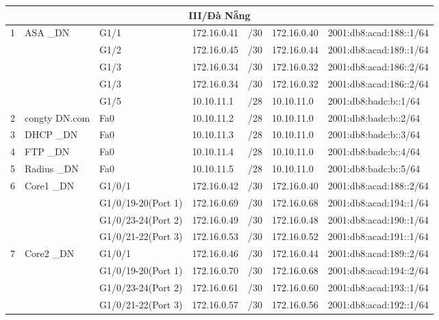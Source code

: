 \documentclass[12pt,a4paper]{report}
\begin{document}
\begin{center}
\begin{longtable}{|p{}|p{}|p{}|p{}|p{}|p{}|p{}|}
        \hline  \multicolumn{7}{|c|}{III/Đà Nẵng} \\
        \hline \multirow{5}{*}{1} &  ASA \_DN  &  G1/1  &  172.16.0.41  &  /30  &  172.16.0.40  &  2001:db8:acad:188::1/64 \\\cline{3-7}		                          &    &  G1/2  &  172.16.0.45  &  /30  &  172.16.0.44  &  2001:db8:acad:189::1/64\\\cline{3-7}	                          		                          &    &  G1/3  &  172.16.0.34  &  /30  &  172.16.0.32  &  2001:db8:acad:186::2/64\\\cline{3-7}                                             		                          &    &  G1/3  &  172.16.0.34  &  /30  &  172.16.0.32  &  2001:db8:acad:186::2/64\\\cline{3-7}                 		                          &    &  G1/5  &  10.10.11.1  &  /28  &  10.10.11.0  &  2001:db8:badc:b::1/64\\\cline{3-7}
        
        \hline  2  &  congty DN.com  &  Fa0  &  10.10.11.2  &  /28  &  10.10.11.0  &  2001:db8:badc:b::2/64 \\
\hline  3  &  DHCP \_DN  &  Fa0  &  10.10.11.3  &  /28  &  10.10.11.0  &  2001:db8:badc:b::3/64 \\
\hline  4  &  FTP \_DN  &  Fa0  &  10.10.11.4  &  /28  &  10.10.11.0  &  2001:db8:badc:b::4/64 \\
\hline  5  &  Radius \_DN  &  Fa0  &  10.10.11.5  &  /28  &  10.10.11.0  &  2001:db8:badc:b::5/64 \\

\hline  \multirow{4}{*}{6}  &  Core1 \_DN  &  G1/0/1  &  172.16.0.42  &  /30  &  172.16.0.40  &  2001:db8:acad:188::2/64 \\\cline{3-7}
&    &  G1/0/19-20(Port 1)  &  172.16.0.69  &  /30  &  172.16.0.68  &  2001:db8:acad:194::1/64 \\\cline{3-7}
&    &  G1/0/23-24(Port 2)  &  172.16.0.49  &  /30  &  172.16.0.48  &  2001:db8:acad:190::1/64 \\\cline{3-7}
&    &  G1/0/21-22(Port 3)  &  172.16.0.53  &  /30  &  172.16.0.52  &  2001:db8:acad:191::1/64 \\\cline{3-7}

\hline  \multirow{4}{*}{7}  &  Core2 \_DN  &  G1/0/1  &  172.16.0.46  &  /30  &  172.16.0.44  &  2001:db8:acad:189::2/64 \\\cline{3-7}
&    &  G1/0/19-20(Port 1)  &  172.16.0.70  &  /30  &  172.16.0.68  &  2001:db8:acad:194::2/64 \\\cline{3-7}
&    &  G1/0/23-24(Port 2)  &  172.16.0.61  &  /30  &  172.16.0.60  &  2001:db8:acad:193::1/64 \\\cline{3-7}
&    &  G1/0/21-22(Port 3)  &  172.16.0.57  &  /30  &  172.16.0.56  &  2001:db8:acad:192::1/64 \\\cline{3-7}


\end{longtable}
\end{center}
\end{document}
